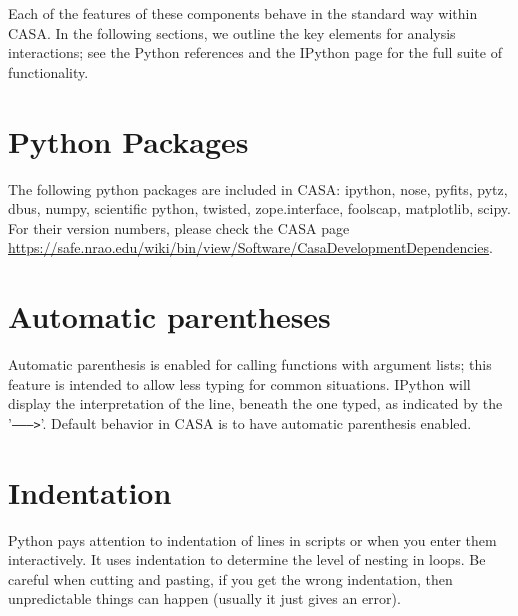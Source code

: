 Each of the features of these components behave in the standard way
within CASA. In the following sections, we outline the key elements
for analysis interactions; see the Python references and the
IPython page for the full suite of functionality.

\section{Python Packages}
\label{section:python.packages}
The following python packages are included in CASA: ipython, nose,
pyfits, pytz, dbus, numpy, scientific python, twisted, zope.interface,
foolscap, matplotlib, scipy. For their version numbers, please check
the CASA page
\url{https://safe.nrao.edu/wiki/bin/view/Software/CasaDevelopmentDependencies}.



\section{Automatic parentheses}
\label{section:python.par}

Automatic parenthesis is enabled for calling functions with argument
lists; this feature is intended to allow less typing for common
situations. IPython will display the interpretation of the line,
beneath the one typed, as indicated by the '{\tt -------->}'. Default
behavior in CASA is to have automatic parenthesis enabled. 

\section{Indentation}
\label{section:python.indent}

Python pays attention to indentation of lines in scripts or when you
enter them interactively.  It uses indentation to determine the level
of nesting in loops.  Be careful when cutting and pasting, if you
get the wrong indentation, then unpredictable things can happen
(usually it just gives an error).  

